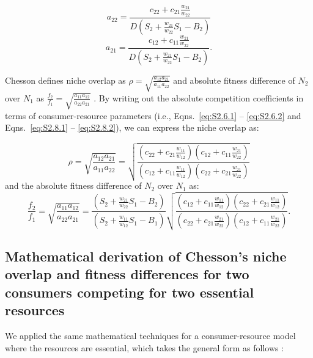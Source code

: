 \begin{equation}
{a_{22}} = \frac{{{c_{22}} + {c_{21}}\frac{{{w_{21}}}}{{{w_{22}}}}}}{{D\left( {{S_2} + \frac{{{w_{21}}}}{{{w_{22}}}}{S_1} - {B_2}} \right)}} 
\tag{S2.8.1}\label{eq:S2.8.1}
\end{equation}
\begin{equation}
{a_{21}} = \frac{{{c_{12}} + {c_{11}}\frac{{{w_{21}}}}{{{w_{22}}}}}}{{D\left( {{S_2} + \frac{{{w_{21}}}}{{{w_{22}}}}{S_1} - {B_2}} \right)}}.
\tag{S2.8.2}\label{eq:S2.8.2}
\end{equation}

Chesson defines niche overlap as $\rho=\sqrt {\frac{{{a_{12}}{a_{21}}}}{{{a_{11}}{a_{22}}}}}$ and absolute fitness difference of $N_{2}$ over $N_{1}$ as $\frac{{{f_2}}}{{{f_1}}} = \sqrt {\frac{{{a_{11}}{a_{12}}}}{{{a_{22}}{a_{21}}}}}$ \citep{Chesson2013ecosys}. By writing out the absolute competition coefficients in terms of consumer-resource parameters (i.e., Eqns.~\ref{eq:S2.6.1} -- \ref{eq:S2.6.2} and Eqns.~\ref{eq:S2.8.1} -- \ref{eq:S2.8.2}), we can express the niche overlap as: 

\begin{equation}
\rho  = \sqrt {\frac{{{a_{12}}{a_{21}}}}{{{a_{11}}{a_{22}}}}}  = \sqrt {\frac{\left (
		c_{22} + c_{21}\frac{w_{11}}{w_{12}}\right )\left ( 
		c_{12} + c_{11}\frac{w_{21}}{w_{22}} \right )}{\left (
		c_{12} + c_{11}\frac{w_{11}}{w_{12}}\right )\left ( 
		c_{22} + c_{21}\frac{w_{21}}{w_{22}} \right )}} 
\tag{S2.9}\label{eq:S2.9}
\end{equation}
and the absolute fitness difference of $N_{2}$ over $N_{1}$ as:
\begin{equation}
\frac{{{f_2}}}{{{f_1}}} = \sqrt {\frac{{{a_{11}}{a_{12}}}}{{{a_{22}}{a_{21}}}}}  = \frac{\left (S_{2}+\frac{w_{21}}{w_{22}}S_{1}-B_{2}\right )}{\left (S_{2}+\frac{w_{11}}{w_{12}}S_{1}-B_{1}\right )}\sqrt {\frac{\left (
		c_{12} + c_{11}\frac{w_{11}}{w_{12}}\right )\left ( 
		c_{22} + c_{21}\frac{w_{11}}{w_{12}} \right )}{\left (
		c_{22} + c_{21}\frac{w_{21}}{w_{22}}\right )\left ( 
		c_{12} + c_{11}\frac{w_{21}}{w_{22}} \right )}}.
\tag{S2.10}\label{eq:2.10}
\end{equation}


\subsection{Mathematical derivation of Chesson's niche overlap and fitness differences for two consumers competing for two essential resources} 
We applied the same mathematical techniques for a consumer-resource model where the resources are essential, which takes the general form as follows \citep{tilman1982}: 

